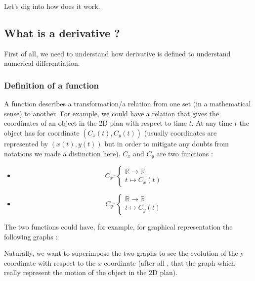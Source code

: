\documentclass[12pt]{article}
\begin{document}
Let's dig into how does it work.

\subsection{What is a derivative ?}

First of all, we need to understand how derivative is defined to understand numerical differentiation. 

\subsubsection{Definition of a function}

A function describes a transformation/a relation from one set (in a mathematical sense) to another. For example, we could have a relation that gives the coordinates of an object in the 2D plan with respect to time $t$. At any time $t$ the object has for coordinate $(C_x(t), C_y(t))$ (usually coordinates are represented by $(x(t), y(t))$ but in order to mitigate any doubts from notations we made a distinction here). $C_x$ and $C_y$ are two functions :


\begin{itemize}
\item[]
$$
C_x: 
    \begin{cases}
        \mathbb{R} \rightarrow \mathbb{R} \\
        t \longmapsto C_x(t)
    \end{cases}
$$

\item[]
$$
C_y: 
    \begin{cases}
        \mathbb{R} \rightarrow \mathbb{R} \\
        t \longmapsto C_y(t)
    \end{cases}
$$
\end{itemize}



The two functions could have, for example, for graphical representation the following graphs : 


\begin{figure}[H]
 \centering
 
\end{figure}

Naturally, we want to superimpose the two graphs to see the evolution of the y coordinate with respect to the $x$ coordinate (after all , that the graph which really represent the motion of the object in the 2D plan). 
\end{document}
